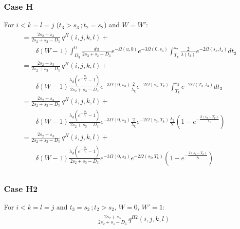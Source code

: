 \documentclass{article}
\begin{document}
\subsubsection{Case H}
For $i<k=l=j$ ($t_3>s_3\,;t_2=s_2$) and $W = W'$:
\begin{align}
    \begin{split}
        &= \frac{2s_2+s_3}{2s_2+s_3-D_3}\,q^{H}(i,j,k,l)+\\
        &\qquad
        \delta(W-1)\int_{D_3}^{0}\frac{du}{2s_3+s_2-D_3}e^{-\Omega(u,0)}e^{-3\Omega(0,s_3)}\int_{T_k}^{s_2}\frac{2}{\lambda(t_3)}e^{-2\Omega(s_3,t_3)}dt_3\\
        &= \frac{2s_2+s_3}{2s_2+s_3-D_3}\,q^{H}(i,j,k,l)+\\
        &\qquad
        \delta(W-1)\frac{\lambda_d\left(e^{-\frac{D_3}{\lambda_d}}-1\right)}{2s_2+s_3-D_3}e^{-3\Omega(0,s_3)}\frac{2}{\lambda_k}e^{-2\Omega(s_3,T_k)}\int_{T_k}^{s_2}e^{-2\Omega(T_k,t_3)}dt_3\\
        &= \frac{2s_2+s_3}{2s_2+s_3-D_3}\,q^{H}(i,j,k,l)+\\
        &\qquad
        \delta(W-1)\frac{\lambda_d\left(e^{-\frac{D_3}{\lambda_d}}-1\right)}{2s_2+s_3-D_3}e^{-3\Omega(0,s_3)}\frac{2}{\lambda_k}e^{-2\Omega(s_3,T_k)}\frac{\lambda_k}{2}\left(1-e^{-\frac{2(s_2-T_k)}{\lambda_k}}\right)\\
        &= \frac{2s_2+s_3}{2s_2+s_3-D_3}\,q^{H}(i,j,k,l)+\\
        &\qquad
        \delta(W-1)\frac{\lambda_d\left(e^{-\frac{D_3}{\lambda_d}}-1\right)}{2s_2+s_3-D_3}e^{-3\Omega(0,s_3)}e^{-2\Omega(s_3,T_k)}\left(1-e^{-\frac{2(s_2-T_k)}{\lambda_k}}\right)\\
    \end{split}
\end{align}

\subsubsection{Case H2}

For $i<k=l=j$ and $t_3=s_2\,;t_2>s_2$, $W = 0$, $W' = 1$:
\begin{align}
    \begin{split}
        &= \frac{2s_2+s_3}{2s_2+s_3-D_3}\,q^{H2}(i,j,k,l)
    \end{split}
\end{align}
\end{document}
